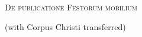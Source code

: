\documentclass[14pt, a4paper]{memoir}
\begin{document}
\begin{center}\begin{huge}\textsc{De publicatione Festorum mobilium}\end{huge}

(with Corpus Christi transferred)
\end{center}



\def\greinitialformat#1{%
{\fontsize{43}{43}\selectfont #1}%
}
\def\gretextformat#1{%
{\fontsize{16}{16}\selectfont #1}%
}

\redlines



{\footnotesize 
\noindent }
\end{document}
